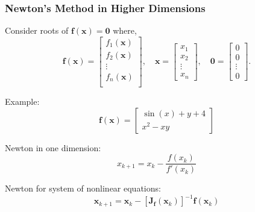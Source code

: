 \documentclass[10pt]{beamer}
\begin{document}
\begin{frame}
\frametitle{Newton's Method in Higher Dimensions}
Consider roots of $\mathbf{f}(\mathbf{x}) = \mathbf{0}$ where,
\[ \mathbf{f}(\mathbf{x}) = \begin{bmatrix}
f_1(\mathbf{x})\\
f_2(\mathbf{x})\\
\vdots \\
f_n(\mathbf{x})\\
\end{bmatrix}, \quad
\mathbf{x} = \begin{bmatrix}
x_1\\
x_2\\
\vdots \\
x_n
\end{bmatrix}, \quad \mathbf{0} = \begin{bmatrix}
0\\
0\\
\vdots\\
0
\end{bmatrix}.
\]

Example:
\[
\mathbf{f}(\mathbf{x}) = \begin{bmatrix}
\sin(x) + y  + 4\\
x^2 - xy
\end{bmatrix}
\]

Newton in one dimension:
\begin{equation*}
    x_{k+1} = x_k - \frac{f(x_k)}{f'(x_k)}
\end{equation*}

Newton  for system of nonlinear equations:
\[
\mathbf{x}_{k+1} = \mathbf{x}_{k} - [\mathbf{J}_{\mathbf{f}}(\mathbf{x}_k)]^{-1} \mathbf{f}(\mathbf{x}_k)
\]

\end{frame}
\end{document}
